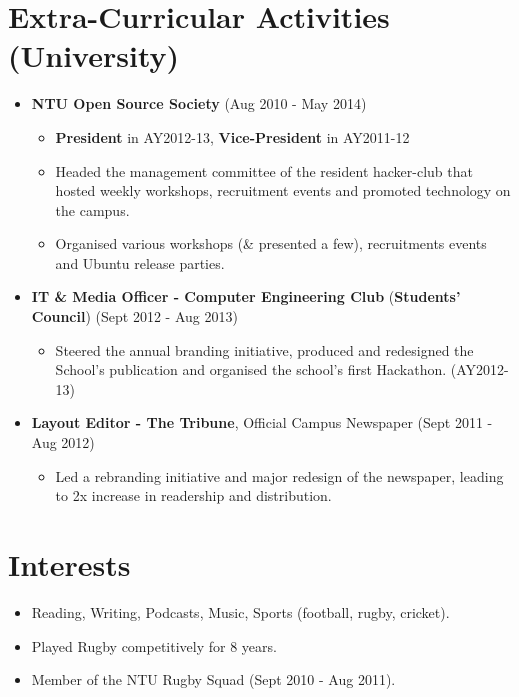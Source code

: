 \section{Extra-Curricular Activities
(University)}\label{extra-curricular-activities-university}

\begin{itemize}
\tightlist
\item
  \textbf{NTU Open Source Society} \hfill (Aug 2010 - May 2014)

  \begin{itemize}
  \tightlist
  \item
    \textbf{President} in AY2012-13, \textbf{Vice-President} in
    AY2011-12
  \item
    Headed the management committee of the resident hacker-club that
    hosted weekly workshops, recruitment events and promoted technology
    on the campus.
  \item
    Organised various workshops (\& presented a few), recruitments
    events and Ubuntu release parties.
  \end{itemize}
\item
  \textbf{IT \& Media Officer - Computer Engineering Club}
  (\textbf{Students' Council}) \hfill (Sept 2012 - Aug 2013)

  \begin{itemize}
  \tightlist
  \item
    Steered the annual branding initiative, produced and redesigned the
    School's publication and organised the school's first Hackathon.
    (AY2012-13)
  \end{itemize}
\item
  \textbf{Layout Editor - The Tribune}, Official Campus Newspaper
  \hfill (Sept 2011 - Aug 2012)

  \begin{itemize}
  \tightlist
  \item
    Led a rebranding initiative and major redesign of the newspaper,
    leading to 2x increase in readership and distribution.
  \end{itemize}
\end{itemize}

\section{Interests}\label{interests}

\begin{itemize}
\tightlist
\item
  Reading, Writing, Podcasts, Music, Sports (football, rugby, cricket).
\item
  Played Rugby competitively for 8 years.
\item
  Member of the NTU Rugby Squad (Sept 2010 - Aug 2011).
\end{itemize}

